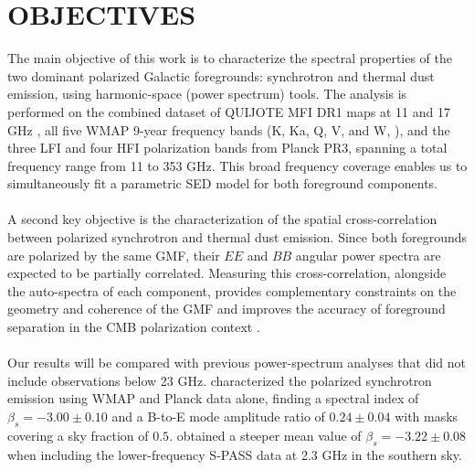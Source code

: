 \section{OBJECTIVES}
\label{sec:objectives}

The main objective of this work is to characterize the spectral properties of the two dominant polarized Galactic foregrounds: synchrotron and thermal dust emission, using harmonic-space (power spectrum) tools. The analysis is performed on the combined dataset of QUIJOTE MFI DR1 maps at 11 and 17 GHz \citep{QUIJOTE_IV}, all five WMAP 9-year frequency bands (K, Ka, Q, V, and W, \citealp{WMAP_maps}), and the three LFI \citep{Planck_2015II} and four HFI polarization bands \citep{Planck_2018III} from Planck PR3, spanning a total frequency range from 11 to 353 GHz. This broad frequency coverage enables us to simultaneously fit a parametric SED model for both foreground components.

\paragraph*{}

A second key objective is the characterization of the spatial cross-correlation between polarized synchrotron and thermal dust emission. Since both foregrounds are polarized by the same GMF, their $EE$ and $BB$ angular power spectra are expected to be partially correlated. Measuring this cross-correlation, alongside the auto-spectra of each component, provides complementary constraints on the geometry and coherence of the GMF and improves the accuracy of foreground separation in the CMB polarization context \citep{Choi_2015}.

\paragraph*{}

Our results will be compared with previous power-spectrum analyses that did not include observations below 23 GHz. \citet{Martire_2022} characterized the polarized synchrotron emission using WMAP and Planck data alone, finding a spectral index of $\beta_s = -3.00 \pm 0.10$ and a B-to-E mode amplitude ratio of $0.24 \pm 0.04$ with masks covering a sky fraction of $0.5$. \citet{Krachmalnicoff_2018} obtained a steeper mean value of $\beta_s = -3.22 \pm 0.08$ when including the lower-frequency S-PASS data at 2.3 GHz in the southern sky.

\paragraph*{}


